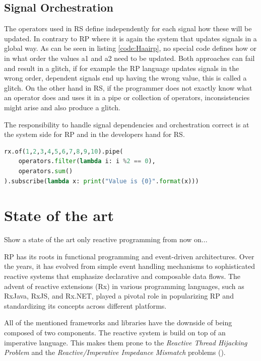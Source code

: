 \documentclass[a4paper]{book}
\begin{document}
\subsection{Signal Orchestration}
The operators used in RS define independently for each signal how these will be updated. In contrary to RP where it is again the system that updates signals in a global way. As can be seen in listing \ref{code:Haairp}, no special code defines how or in what order the values a1 and a2 need to be updated. Both approaches can fail and result in a glitch, if for example the RP language updates signals in the wrong order, dependent signals end up having the wrong value, this is called a glitch. On the other hand in RS, if the programmer does not exactly know what an operator does and uses it in a pipe or collection of operators, inconsistencies might arise and also produce a glitch. 

\vspace{1em} %
\noindent
The responsibility to handle signal dependencies and orchestration correct is at the system side for RP and in the developers hand for RS.


\begin{lstlisting}[language=Python, caption={Python, RxPy library}, label={code:rxpy}, basicstyle=\small\ttfamily, frame=single]
rx.of(1,2,3,4,5,6,7,8,9,10).pipe(
	operators.filter(lambda i: i %2 == 0),
	operators.sum()
).subscribe(lambda x: print("Value is {0}".format(x)))
\end{lstlisting}





\section{State of the art}

Show a state of the art only reactive programming from now on...

RP has its roots in functional programming and event-driven architectures. Over the years, it has evolved from simple event handling mechanisms to sophisticated reactive systems that emphasize declarative and composable data flows. The advent of reactive extensions (Rx) in various programming languages, such as RxJava, RxJS, and Rx.NET, played a pivotal role in popularizing RP and standardizing its concepts across different platforms.

All of the mentioned frameworks and libraries have the downside of being composed of two components. The reactive system is build on top of an imperative language. This makes them prone to the \textit{Reactive Thread Hijacking Problem} and the \textit{Reactive/Imperative Impedance Mismatch} problems (\cite{vonder_tackling_2020}).
\end{document}
